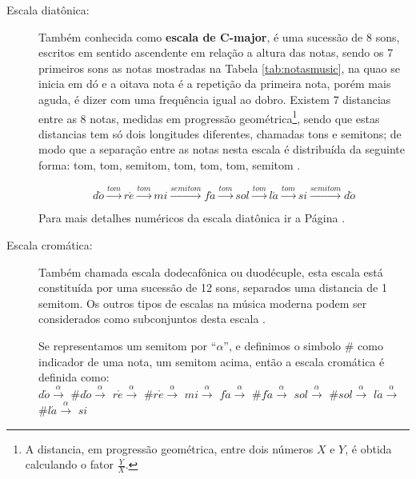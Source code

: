 \begin{description}

\item [Escala diatônica:] \label{sec:pos:Diatonica}
Também conhecida como \textbf{escala de C-major},
é uma sucessão de 8 sons,  escritos em sentido ascendente em relação a altura das notas, 
sendo os 7 primeiros sons as notas mostradas na Tabela \ref{tab:notasmusic}, na quao se inicia em dó
e a oitava nota é a repetição da primeira nota, 
porém mais aguda, é dizer com uma frequência igual ao dobro.
Existem 7 distancias entre as 8 notas, medidas em progressão geométrica\footnote{A 
distancia, em progressão geométrica, entre dois números $X$ e $Y$, é obtida calculando o fator $\frac{Y}{X}$. }, 
sendo que estas distancias tem só dois longitudes diferentes, chamadas tons e semitons;
de modo que a separação entre as notas nesta escala é distribuída da seguinte forma: 
tom, tom, semitom, tom, tom, tom, semitom \cite[pp. 30]{cardoso1973curso}\cite[pp. 753]{apel1969harvard}.
\begin{example}
\begin{equation*}
d\acute{o}\overset{tom}{\rightarrow}
r\acute{e}\overset{tom}{\rightarrow}
mi\overset{semitom}{\rightarrow}
f\acute{a}\overset{tom}{\rightarrow}
sol\overset{tom}{\rightarrow}
l\acute{a}\overset{tom}{\rightarrow}
si\overset{semitom}{\rightarrow}
d\acute{o}
\end{equation*}
\end{example}
Para mais detalhes numéricos da escala diatônica ir a Página \pageref{ref:paginadiatonicanumerica}.


\item [Escala cromática:] \label{sec:pos:Cromatica}
Também chamada escala dodecafônica ou duodécuple, 
esta escala está constituída por uma sucessão de 12 sons, separados uma distancia de 1 semitom.
Os outros tipos de escalas na música moderna podem ser considerados como subconjuntos desta escala \cite[pp. 753]{apel1969harvard}.
\begin{example} 
Se representamos um semitom por ``$\alpha$'', 
e definimos o simbolo $\#$ como indicador de uma nota, um semitom acima, 
então a escala cromática é definida como:\\
$d\acute{o}\overset{\alpha}{\rightarrow}$
$\#d\acute{o}\overset{\alpha}{\rightarrow}$
$r\acute{e}\overset{\alpha}{\rightarrow}$
$\#r\acute{e}\overset{\alpha}{\rightarrow}$
$mi\overset{\alpha}{\rightarrow}$
$f\acute{a}\overset{\alpha}{\rightarrow}$
$\#f\acute{a}\overset{\alpha}{\rightarrow}$
$sol\overset{\alpha}{\rightarrow}$
$\#sol\overset{\alpha}{\rightarrow}$
$l\acute{a}\overset{\alpha}{\rightarrow}$
$\#l\acute{a}\overset{\alpha}{\rightarrow}$
$si$
\end{example}
\end{description}


